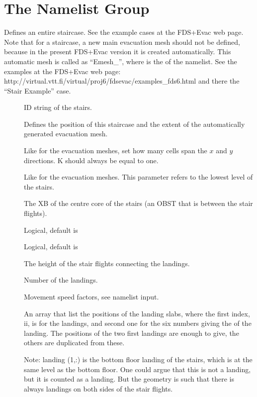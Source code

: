 \documentclass[12pt,a4paper,final,twoside]{stylevk}
\begin{document}
\section{The  Namelist Group}\label{Sec_StrsNML}

\noindent Defines an entire staircase.  See the example cases at the
FDS+Evac web page.  Note that for a  staircase, a new main
evacuation mesh should not be defined, because in the present FDS+Evac
version it is created automatically.  This automatic mesh is called as
``Emesh\_'', where  is the  of the
 namelist.  See the examples at the FDS+Evac web page:
http://virtual.vtt.fi/virtual/proj6/fdsevac/examples\_fds6.html and
there the ``Stair Example'' case.


\begin{description}
%
%
\item[] ID string of the stairs.
%
\item[] Defines the position of this staircase and the
  extent of the automatically generated evacuation mesh.
%
\item[] Like for the evacuation meshes, set how many cells
  span the $x$ and $y$ directions. K should always be equal to one.
%
\item[] Like for the evacuation meshes.  This
  parameter refers to the lowest level of the stairs. 
%
\item[] The XB of the centre core of the stairs
  (an OBST that is between the stair flights).
%
\item[] Logical, default is 
%
\item[] Logical, default is 
%
\item[] The height of the stair
  flights connecting the landings.
%
\item[] Number of the landings.
%
\item[] Movement
  speed factors, see  namelist input.
%
\item[] An array that list the positions of
  the landing slabs, where the first index, ii, is for the landings,
  and second one for the six numbers giving the  of the landing.
  The positions of the two first landings are enough to give, the
  others are duplicated from these.

  Note: landing (1,:) is the bottom floor landing of the stairs, which
  is at the same level as the bottom floor. One could argue that this
  is not a landing, but it is counted as a landing. But the 
  geometry is such that there is always landings on both sides of the
  stair flights.

%
%
\end{description}
%
\end{document}
